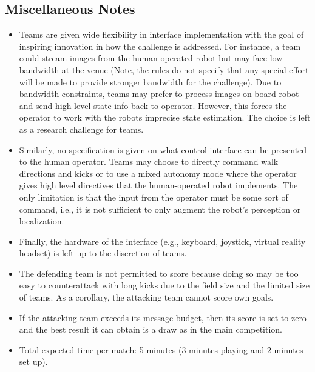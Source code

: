 \subsection{Miscellaneous Notes}

\begin{itemize}
\item Teams are given wide flexibility in interface implementation with the goal of inspiring innovation in how the challenge is addressed. For instance, a team could stream images from the human-operated robot but may face low bandwidth at the venue  (Note, the rules do not specify that any special effort will be made to provide stronger bandwidth for the challenge). Due to bandwidth constraints, teams may prefer to process images on board robot and send high level state info back to operator. However, this forces the operator to work with the robots imprecise state estimation. The choice is left as a research challenge for teams. 
\item Similarly, no specification is given on what control interface can be presented to the human operator. Teams may choose to directly command walk directions and kicks or to use a mixed autonomy mode where the operator gives high level directives that the human-operated robot implements. The only limitation is that the input from the operator must be some sort of command, i.e., it is not sufficient to only augment the robot's perception or localization.
\item Finally, the hardware of the interface (e.g., keyboard, joystick, virtual reality headset) is left up to the discretion of teams.
\item The defending team is not permitted to score because doing so may be too easy to counterattack with long kicks due to the field size and the limited size of teams. As a corollary, the attacking team cannot score own goals.
\item If the attacking team exceeds its message budget, then its score is set to zero and the best result it can obtain is a draw as in the main competition.
\item Total expected time per match: 5 minutes (3 minutes playing and 2 minutes set up). 
\end{itemize}


